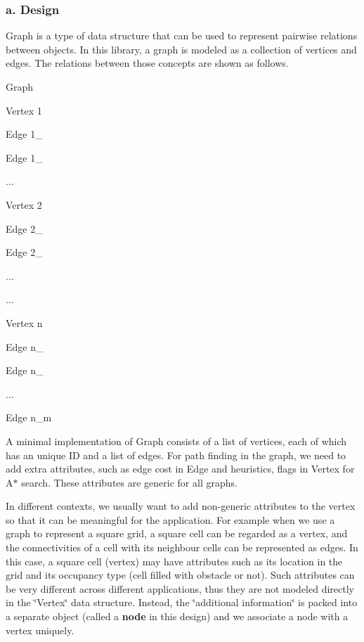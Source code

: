 \subsubsection*{a. Design}

Graph is a type of data structure that can be used to represent pairwise relations between objects. In this library, a graph is modeled as a collection of vertices and edges. The relations between those concepts are shown as follows.
\begin{DoxyItemize}
\item Graph
\begin{DoxyItemize}
\item Vertex 1
\begin{DoxyItemize}
\item Edge 1\-\_
\item Edge 1\-\_
\item ...
\end{DoxyItemize}
\item Vertex 2
\begin{DoxyItemize}
\item Edge 2\-\_
\item Edge 2\-\_
\item ...
\end{DoxyItemize}
\item ...
\item Vertex n
\begin{DoxyItemize}
\item Edge n\-\_
\item Edge n\-\_
\item ...
\item Edge n\-\_\-m
\end{DoxyItemize}
\end{DoxyItemize}
\end{DoxyItemize}

A minimal implementation of Graph consists of a list of vertices, each of which has an unique I\-D and a list of edges. For path finding in the graph, we need to add extra attributes, such as edge cost in Edge and heuristics, flags in Vertex for A$\ast$ search. These attributes are generic for all graphs.

In different contexts, we usually want to add non-\/generic attributes to the vertex so that it can be meaningful for the application. For example when we use a graph to represent a square grid, a square cell can be regarded as a vertex, and the connectivities of a cell with its neighbour cells can be represented as edges. In this case, a square cell (vertex) may have attributes such as its location in the grid and its occupancy type (cell filled with obstacle or not). Such attributes can be very different across different applications, thus they are not modeled directly in the \char`\"{}\-Vertex\char`\"{} data structure. Instead, the \char`\"{}additional information\char`\"{} is packed into a separate object (called a {\bfseries node} in this design) and we associate a node with a vertex uniquely.

